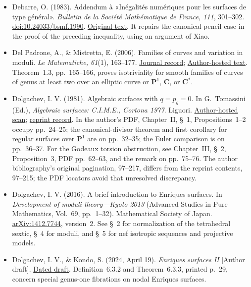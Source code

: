 \begin{sloppypar}
\begin{itemize}
\item Debarre, O. (1983). Addendum à «Inégalités numériques pour les surfaces de type général». \emph{Bulletin de la Société Mathématique de France, 111}, 301--302. \href{https://doi.org/10.24033/bsmf.1990}{doi:10.24033/bsmf.1990}. \href{https://www.numdam.org/article/BSMF_1983__111__301_0.pdf}{Original text}. It repairs the canonical-pencil case in the proof of the preceding inequality, using an argument of Xiao.

\item Del Padrone, A., \& Mistretta, E. (2006). Families of curves and variation in moduli. \emph{Le Matematiche, 61}(1), 163--177. \href{https://lematematiche.dmi.unict.it/index.php/lematematiche/article/view/113}{Journal record}; \href{https://www.math.unipd.it/~ernesto/pub/pragmaticum-2.pdf}{Author-hosted text}. Theorem~1.3, pp.~165--166, proves isotriviality for smooth families of curves of genus at least two over an elliptic curve or $\mathbf P^1$, $\mathbf C$, or $\mathbf C^*$.

\item Dolgachev, I. V. (1981). Algebraic surfaces with $q=p_g=0$. In G.~Tomassini (Ed.), \emph{Algebraic surfaces: C.I.M.E., Cortona 1977}. Liguori. \href{https://sites.lsa.umich.edu/idolga-new/wp-content/uploads/sites/1467/2024/08/cortona81.pdf}{Author-hosted scan}; \href{https://link.springer.com/book/10.1007/978-3-642-11087-0}{reprint record}. In the author's PDF, Chapter~II, \S~1, Propositions~1--2 occupy pp.~24--25; the canonical-divisor theorem and first corollary for regular surfaces over $\mathbf P^1$ are on pp.~32--35; the Euler comparison is on pp.~36--37. For the Godeaux torsion obstruction, see Chapter~III, \S~2, Proposition~3, PDF pp.~62--63, and the remark on pp.~75--76. The author bibliography's original pagination, 97--217, differs from the reprint contents, 97--215; the PDF locators avoid that unresolved discrepancy.

\item Dolgachev, I. V. (2016). A brief introduction to Enriques surfaces. In \emph{Development of moduli theory---Kyoto 2013} (Advanced Studies in Pure Mathematics, Vol.~69, pp.~1--32). Mathematical Society of Japan. \href{https://arxiv.org/abs/1412.7744}{arXiv:1412.7744}, version~2. See \S~2 for normalization of the tetrahedral sextic, \S~4 for moduli, and \S~5 for nef isotropic sequences and projective models.

\item Dolgachev, I. V., \& Kond\=o, S. (2024, April 19). \emph{Enriques surfaces II} [Author draft]. \href{https://sites.lsa.umich.edu/idolga/wp-content/uploads/sites/1334/2024/08/EnriquesTwo.pdf}{Dated draft}. Definition~6.3.2 and Theorem~6.3.3, printed p.~29, concern special genus-one fibrations on nodal Enriques surfaces.


\end{itemize}
\end{sloppypar}
